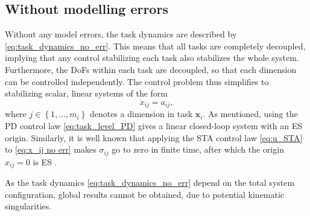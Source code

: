 \documentclass[../main.tex]{subfiles}
\begin{document}
\subsection{Without modelling errors}
Without any model errors, the task dynamics are described by \eqref{eq:task_dynamics_no_err}. This means that all tasks are completely decoupled, implying that any control stabilizing each task also stabilizes the whole system. Furthermore, the DoFs within each task are decoupled, so that each dimension can be controlled independently. The control problem thus simplifies to stabilizing scalar, linear systems of the form
\begin{equation}
    \label{eq:x_ij no err}
    \ddot{x}_{ij} = a_{ij},
\end{equation}
where $j \in \left\{1,\dots,m_i\right\}$ denotes a dimension in task $\bm{x}_i$.
As mentioned, using the PD control law \eqref{eq:task_level_PD} gives a linear closed-loop system with an ES origin. Similarly, it is well known that applying the STA control law \eqref{eq:u_STA} to \eqref{eq:x_ij no err} makes $\sigma_{ij}$ go to zero in finite time, after which the origin $x_{ij}=0$ is ES \citep{Moreno2009}.
\begin{remark}
    As the task dynamics \eqref{eq:task_dynamics_no_err} depend on the total system configuration, global results cannot be obtained, due to potential kinematic singularities.
\end{remark}
\end{document}
